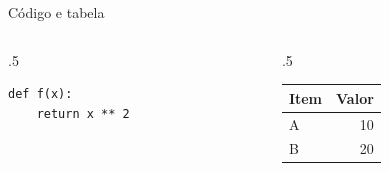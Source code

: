 \documentclass[aspectratio=169,10pt]{beamer}
\begin{document}
\begin{frame}[fragile]{Código e tabela}
  \begin{columns}[T]
    \begin{column}{.5\textwidth}
\begin{verbatim}
def f(x):
    return x ** 2
\end{verbatim}
    \end{column}
    \begin{column}{.5\textwidth}
      \centering
      \begin{tabular}{lr}
        \hline
        Item & Valor \\ \hline
        A & 10 \\
        B & 20 \\ \hline
      \end{tabular}
    \end{column}
  \end{columns}
\end{frame}

\obrigado[Perguntas?]
\end{document}
